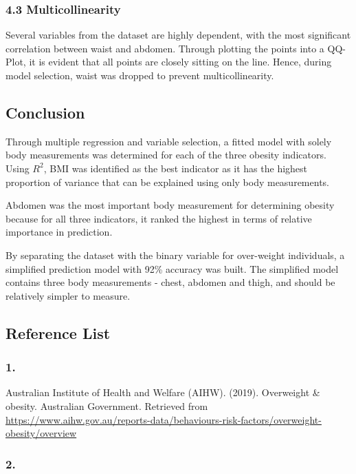 \documentclass[a4paper,9pt,twocolumn,twoside,]{pinp}
\begin{document}
\hypertarget{multicollinearity}{%
\subsubsection{4.3 Multicollinearity}\label{multicollinearity}}

Several variables from the dataset are highly dependent, with the most
significant correlation between waist and abdomen. Through plotting the
points into a QQ-Plot, it is evident that all points are closely sitting
on the line. Hence, during model selection, waist was dropped to prevent
multicollinearity.

\hypertarget{conclusion}{%
\subsection{Conclusion}\label{conclusion}}

Through multiple regression and variable selection, a fitted model with
solely body measurements was determined for each of the three obesity
indicators. Using \(R^2\), BMI was identified as the best indicator as
it has the highest proportion of variance that can be explained using
only body measurements.

Abdomen was the most important body measurement for determining obesity
because for all three indicators, it ranked the highest in terms of
relative importance in prediction.

By separating the dataset with the binary variable for over-weight
individuals, a simplified prediction model with 92\% accuracy was built.
The simplified model contains three body measurements - chest, abdomen
and thigh, and should be relatively simpler to measure.

\hypertarget{reference-list}{%
\subsection{Reference List}\label{reference-list}}

\hypertarget{section}{%
\subsubsection{1.}\label{section}}

Australian Institute of Health and Welfare (AIHW). (2019). Overweight \&
obesity. Australian Government. Retrieved from
\url{https://www.aihw.gov.au/reports-data/behaviours-risk-factors/overweight-obesity/overview}

\hypertarget{section-1}{%
\subsubsection{2.}\label{section-1}}
\end{document}
